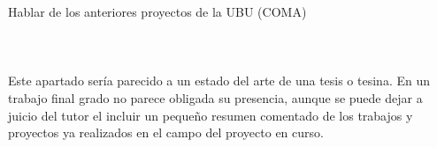 
Hablar de los anteriores proyectos de la UBU (COMA)
\\\\
\\\\

Este apartado sería parecido a un estado del arte de una tesis o tesina. En un trabajo final grado no parece obligada su presencia, aunque se puede dejar a juicio del tutor el incluir un pequeño resumen comentado de los trabajos y proyectos ya realizados en el campo del proyecto en curso. 
